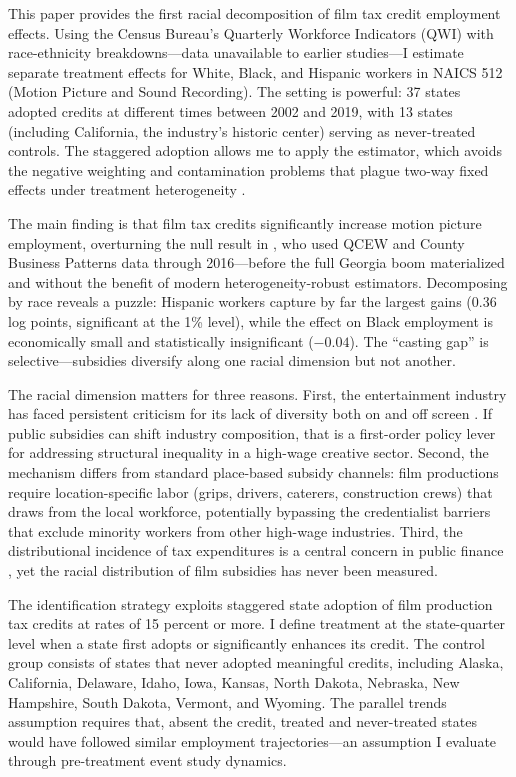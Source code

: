 \documentclass[12pt]{article}
\begin{document}
This paper provides the first racial decomposition of film tax credit employment effects. Using the Census Bureau's Quarterly Workforce Indicators (QWI) with race-ethnicity breakdowns---data unavailable to earlier studies---I estimate separate treatment effects for White, Black, and Hispanic workers in NAICS 512 (Motion Picture and Sound Recording). The setting is powerful: 37 states adopted credits at different times between 2002 and 2019, with 13 states (including California, the industry's historic center) serving as never-treated controls. The staggered adoption allows me to apply the \citet{CallawayS2021} estimator, which avoids the negative weighting and contamination problems that plague two-way fixed effects under treatment heterogeneity \citep{deChaisemartin2020, GoodmanBacon2021}.

The main finding is that film tax credits significantly increase motion picture employment, overturning the null result in \citet{Button2019}, who used QCEW and County Business Patterns data through 2016---before the full Georgia boom materialized and without the benefit of modern heterogeneity-robust estimators. Decomposing by race reveals a puzzle: Hispanic workers capture by far the largest gains (0.36 log points, significant at the 1\% level), while the effect on Black employment is economically small and statistically insignificant ($-0.04$). The ``casting gap'' is selective---subsidies diversify along one racial dimension but not another.

The racial dimension matters for three reasons. First, the entertainment industry has faced persistent criticism for its lack of diversity both on and off screen \citep{Hunt2020}. If public subsidies can shift industry composition, that is a first-order policy lever for addressing structural inequality in a high-wage creative sector. Second, the mechanism differs from standard place-based subsidy channels: film productions require location-specific labor (grips, drivers, caterers, construction crews) that draws from the local workforce, potentially bypassing the credentialist barriers that exclude minority workers from other high-wage industries. Third, the distributional incidence of tax expenditures is a central concern in public finance \citep{Saez2016}, yet the racial distribution of film subsidies has never been measured.

The identification strategy exploits staggered state adoption of film production tax credits at rates of 15 percent or more. I define treatment at the state-quarter level when a state first adopts or significantly enhances its credit. The control group consists of states that never adopted meaningful credits, including Alaska, California, Delaware, Idaho, Iowa, Kansas, North Dakota, Nebraska, New Hampshire, South Dakota, Vermont, and Wyoming. The parallel trends assumption requires that, absent the credit, treated and never-treated states would have followed similar employment trajectories---an assumption I evaluate through pre-treatment event study dynamics.
\end{document}
